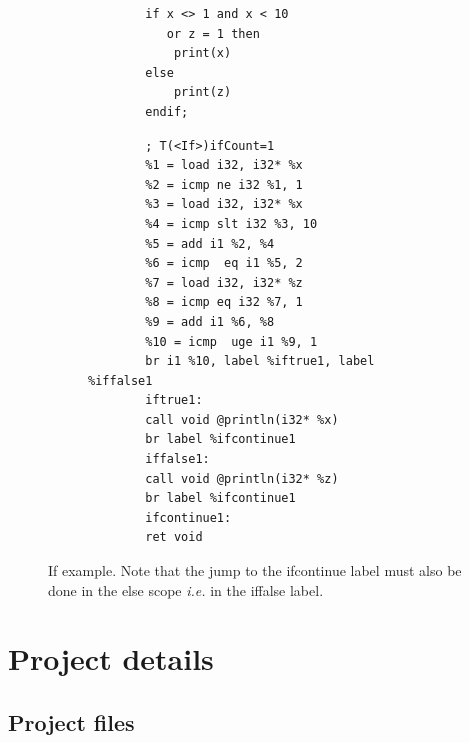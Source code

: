 \documentclass[letterpaper]{article}
\begin{document}
\begin{figure}[H]
    \begin{subfigure}{.5\textwidth}
        \begin{lstlisting}
        if x <> 1 and x < 10
           or z = 1 then
            print(x)
        else
            print(z)
        endif;
        \end{lstlisting}
    \end{subfigure}
    \begin{subfigure}{.5\textwidth}
        \begin{lstlisting}
        ; T(<If>)ifCount=1
    	%1 = load i32, i32* %x
    	%2 = icmp ne i32 %1, 1
    	%3 = load i32, i32* %x
    	%4 = icmp slt i32 %3, 10
    	%5 = add i1 %2, %4
    	%6 = icmp  eq i1 %5, 2
    	%7 = load i32, i32* %z
    	%8 = icmp eq i32 %7, 1
    	%9 = add i1 %6, %8
    	%10 = icmp  uge i1 %9, 1
    	br i1 %10, label %iftrue1, label %iffalse1
    	iftrue1:
    	call void @println(i32* %x)
    	br label %ifcontinue1
    	iffalse1:
    	call void @println(i32* %z)
    	br label %ifcontinue1
    	ifcontinue1:
    	ret void
        \end{lstlisting}
    \end{subfigure}
    \caption{If example. Note that the jump to the ifcontinue label must
    also be done in the else scope \textit{i.e.} in the iffalse label.}
\end{figure}

\section{Project details}

\subsection{Project files}
\end{document}
